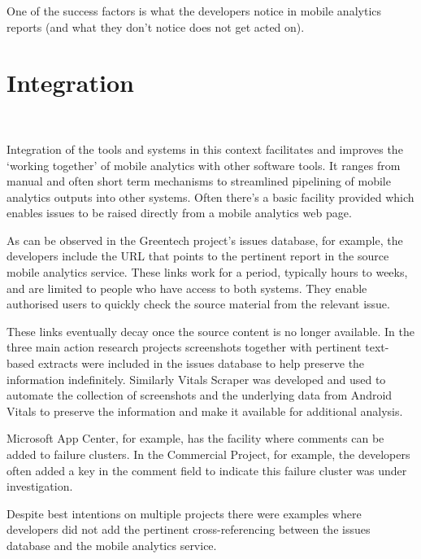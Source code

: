 One of the success factors is what the developers notice in mobile analytics reports (and what they don't notice does not get acted on).

\section{Integration}~\label{aiu-integration-section}

Integration of the tools and systems in this context facilitates and improves the `working together' of mobile analytics with other software tools. It ranges from manual and often short term mechanisms to streamlined pipelining of mobile analytics outputs into other systems. Often there's a basic facility provided which enables issues to be raised directly from a mobile analytics web page.

As can be observed in the Greentech project's issues database, for example, the developers include the URL that points to the pertinent report in the source mobile analytics service. These links work for a period, typically hours to weeks, and are limited to people who have access to both systems. They enable authorised users to quickly check the source material from the relevant issue. 

These links eventually decay once the source content is no longer available. In the three main action research projects screenshots together with pertinent text-based extracts were included in the issues database to help preserve the information indefinitely. Similarly Vitals Scraper was developed and used to automate the collection of screenshots and the underlying data from Android Vitals to preserve the information and make it available for additional analysis.

Microsoft App Center, for example, has the facility where comments can be added to failure clusters. In the Commercial Project, for example, the developers often added a key in the comment field to indicate this failure cluster was under investigation. 

Despite best intentions on multiple projects there were examples where developers did not add the pertinent cross-referencing between the issues database and the mobile analytics service.


